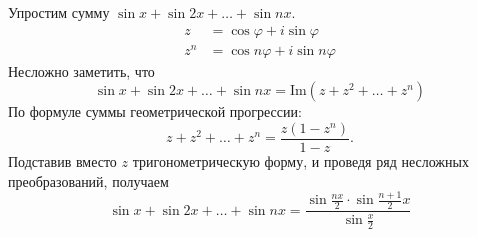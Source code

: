 \documentclass[12pt, a4paper]{article}
\begin{document}
    \begin{exmp}
        Упростим сумму \( \sin x + \sin  2x + \ldots + \sin nx \).
        \begin{align*}
            z &= \cos  \varphi + i \sin \varphi \\
            z^{n} &= \cos n\varphi + i \sin n\varphi 
        \end{align*}
        Несложно заметить, что \[
            \sin x + \sin 2x + \ldots  + \sin  nx = \mathrm{Im}(z + z^2 + \ldots + z^{n} )
        \] 
        По формуле суммы геометрической прогрессии:\[
            z + z^2 + \ldots  + z^{n} = \frac{z(1 - z^{n} )}{1 - z}.
        \] Подставив вместо \( z \) тригонометрическую форму, и проведя ряд несложных преобразований, получаем \[
            \sin x + \sin 2x + \ldots + \sin nx = \frac{\sin \frac{nx}{2} \cdot \sin \frac{n+1}{2}x}{\sin \frac{x}{2}}
        \] 
        
    \end{exmp}
\end{document}

